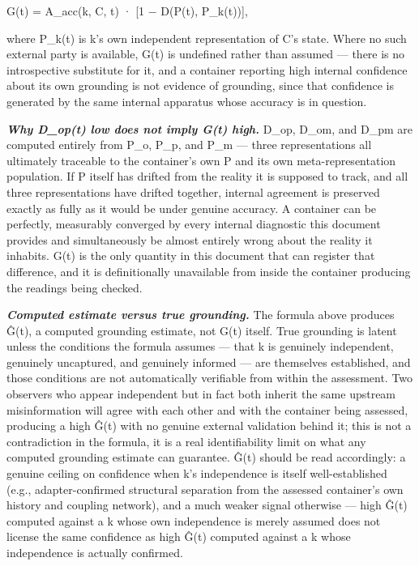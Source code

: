 \documentclass[
]{article}
\begin{document}
G(t) = A\_acc(k, C, t) · {[}1 − D(P(t), P\_k(t)){]},

where P\_k(t) is k's own independent representation of C's state. Where
no such external party is available, G(t) is undefined rather than
assumed --- there is no introspective substitute for it, and a container
reporting high internal confidence about its own grounding is not
evidence of grounding, since that confidence is generated by the same
internal apparatus whose accuracy is in question.

\emph{\textbf{Why D\_op(t) low does not imply G(t) high.}} D\_op, D\_om,
and D\_pm are computed entirely from P\_o, P\_p, and P\_m --- three
representations all ultimately traceable to the container's own P and
its own meta-representation population. If P itself has drifted from the
reality it is supposed to track, and all three representations have
drifted together, internal agreement is preserved exactly as fully as it
would be under genuine accuracy. A container can be perfectly,
measurably converged by every internal diagnostic this document provides
and simultaneously be almost entirely wrong about the reality it
inhabits. G(t) is the only quantity in this document that can register
that difference, and it is definitionally unavailable from inside the
container producing the readings being checked.

\emph{\textbf{Computed estimate versus true grounding.}} The formula
above produces Ĝ(t), a computed grounding estimate, not G(t) itself.
True grounding is latent unless the conditions the formula assumes ---
that k is genuinely independent, genuinely uncaptured, and genuinely
informed --- are themselves established, and those conditions are not
automatically verifiable from within the assessment. Two observers who
appear independent but in fact both inherit the same upstream
misinformation will agree with each other and with the container being
assessed, producing a high Ĝ(t) with no genuine external validation
behind it; this is not a contradiction in the formula, it is a real
identifiability limit on what any computed grounding estimate can
guarantee. Ĝ(t) should be read accordingly: a genuine ceiling on
confidence when k's independence is itself well-established (e.g.,
adapter-confirmed structural separation from the assessed container's
own history and coupling network), and a much weaker signal otherwise
--- high Ĝ(t) computed against a k whose own independence is merely
assumed does not license the same confidence as high Ĝ(t) computed
against a k whose independence is actually confirmed.
\end{document}
